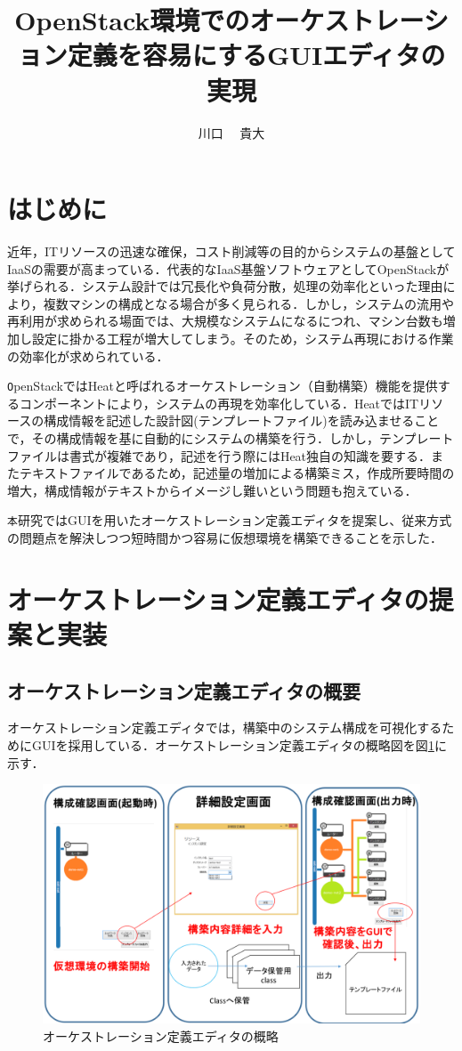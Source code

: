 \documentclass[a4j]{jarticle}
\title{OpenStack環境でのオーケストレーション定義を容易にするGUIエディタの実現}
\author{川口 ~~貴大}
\begin{document}
\begin{Abstract}
 
 \section{はじめに}
 近年，ITリソースの迅速な確保，コスト削減等の目的からシステムの基盤としてIaaSの需要が高まっている．代表的なIaaS基盤ソフトウェアとしてOpenStackが挙げられる．\cite{Document:1}システム設計では冗長化や負荷分散，処理の効率化といった理由により，複数マシンの構成となる場合が多く見られる．しかし，システムの流用や再利用が求められる場面では、大規模なシステムになるにつれ、マシン台数も増加し設定に掛かる工程が増大してしまう。そのため，システム再現における作業の効率化が求められている．
 
 \texttt OpenStackではHeatと呼ばれるオーケストレーション（自動構築）機能を提供するコンポーネントにより，システムの再現を効率化している．HeatではITリソースの構成情報を記述した設計図(テンプレートファイル)を読み込ませることで，その構成情報を基に自動的にシステムの構築を行う．しかし，テンプレートファイルは書式が複雑であり，記述を行う際にはHeat独自の知識を要する．またテキストファイルであるため，記述量の増加による構築ミス，作成所要時間の増大，構成情報がテキストからイメージし難いという問題も抱えている．
 
 \texttt 本研究ではGUIを用いたオーケストレーション定義エディタを提案し、従来方式の問題点を解決しつつ短時間かつ容易に仮想環境を構築できることを示した．
 \section{オーケストレーション定義エディタの提案と実装}
 \subsection{オーケストレーション定義エディタの概要}
 オーケストレーション定義エディタでは，構築中のシステム構成を可視化するためにGUIを採用している．オーケストレーション定義エディタの概略図を図\ref{graf:1}に示す．
 \begin{figure}[H]
 	\begin{center}
 		\includegraphics[scale=0.245]{Document/GUIEditorOverview.eps}
 		\caption{オーケストレーション定義エディタの概略}
 		\label{graf:1}
 	\end{center}
 \end{figure}

\end{Abstract}
\end{document}
